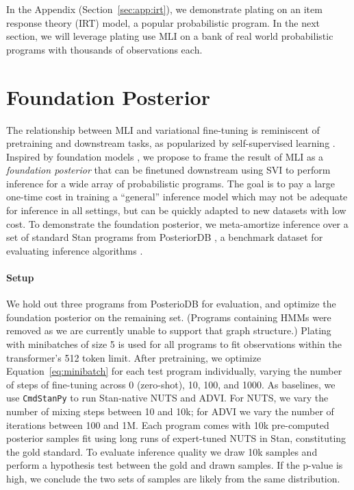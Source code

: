In the Appendix (Section~\ref{sec:app:irt}), we demonstrate plating on an item response theory (IRT) \cite{edgeworth1888statistics,hambleton1991fundamentals,rasch1993probabilistic,wu2020variational,wu2021modeling} model, a popular probabilistic program. In the next section, we will leverage plating use MLI on a bank of real world probabilistic programs with thousands of observations each.

\section{Foundation Posterior}
\label{sec:stan}

The relationship between MLI and variational fine-tuning is reminiscent of pretraining and downstream tasks, as popularized by self-supervised learning \cite{devlin2018bert,chen2020simple}. Inspired by foundation models \cite{bommasani2021opportunities}, we propose to frame the result of MLI as a \textit{foundation posterior} that can be finetuned downstream using SVI to perform inference for a wide array of probabilistic programs. The goal is to pay a large one-time cost in training a ``general'' inference model which may not be adequate for inference in all settings, but can be quickly adapted to new datasets with low cost.
To demonstrate the foundation posterior, we meta-amortize inference over a set of standard Stan \cite{carpenter2017stan} programs from PosteriorDB \cite{magnusson2021}, a benchmark dataset for evaluating  inference algorithms \cite{baudart2021compiling,baudart2021automatic,yao2020stacking,zhang2021pathfinder,durr2022bernstein}.

\paragraph{Setup} We hold out three programs from PosterioDB for evaluation, and optimize the foundation posterior on the remaining set. (Programs containing HMMs were removed as we are currently unable to support that graph structure.) Plating with minibatches of size 5 is used for all programs to fit observations within the transformer's 512 token limit. After pretraining, we optimize Equation~\ref{eq:minibatch} for each test program individually, varying the number of steps of fine-tuning across 0 (zero-shot), 10, 100, and 1000. As baselines, we use \texttt{CmdStanPy} to run Stan-native NUTS and ADVI. For NUTS, we vary the number of mixing steps between 10 and 10k; for ADVI we vary the number of iterations between 100 and 1M. Each program comes with 10k pre-computed posterior samples fit using long runs of expert-tuned NUTS in Stan, constituting the gold standard. To evaluate inference quality we draw 10k samples and perform a hypothesis test between the gold and drawn samples. If the p-value is high, we conclude the two sets of samples are likely from the same distribution.

